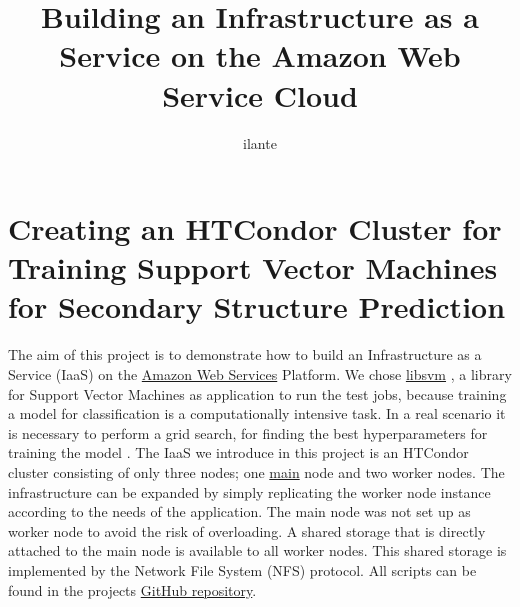 \documentclass{article}
\begin{document}
\title{Building an Infrastructure as a Service on the Amazon Web Service Cloud}
\author{ilante}

\maketitle

\section{Creating an HTCondor Cluster for Training Support Vector Machines for Secondary Structure Prediction}

The aim of this project is to demonstrate how to build an Infrastructure as a Service (IaaS) on the \href{https://aws.amazon.com/}{Amazon Web Services} Platform. 
We chose \href{https://www.csie.ntu.edu.tw/~cjlin/libsvm/}{libsvm} \cite{chang_libsvm_2011}, 
a library for Support Vector Machines as application to run the test jobs, because training a model for classification is a computationally intensive task. 
In a real scenario it is necessary to perform a grid search, for finding the best hyperparameters for training the model \cite{gholami_chapter_2017}.
The IaaS we introduce in this project is an HTCondor cluster consisting of only three nodes; one \href{https://web.archive.org/web/20210531104015/https://www.independent.co.uk/life-style/gadgets-and-tech/news/github-master-slave-slavery-whitelist-language-inclusive-a9568576.html}{main} node and two worker nodes. 
The infrastructure can be expanded by simply replicating the worker node instance according to the needs of the application.
The main node was not set up as worker node to avoid the risk of overloading.
A shared storage that is directly attached to the main node is available to all worker nodes. This shared storage is implemented by the Network File System (NFS) protocol.
All scripts can be found in the projects \footnotesize \href{https://github.com/ilante/BDP-projcect-aws-main}{GitHub repository}.
\end{document}
